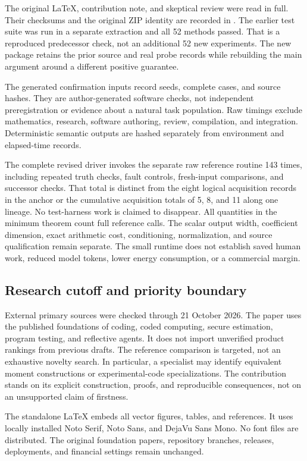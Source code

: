 \documentclass[11pt,letterpaper]{article}
\theoremstyle{remark}\newtheorem{remark}{Remark}[section]
\begin{document}
The original LaTeX, contribution note, and skeptical review were read in full. Their checksums and the original ZIP identity are recorded in . The earlier test suite was run in a separate extraction and all 52 methods passed. That is a reproduced predecessor check, not an additional 52 new experiments. The new package retains the prior source and real probe records while rebuilding the main argument around a different positive guarantee.

The generated confirmation inputs record seeds, complete cases, and source hashes. They are author-generated software checks, not independent preregistration or evidence about a natural task population. Raw timings exclude mathematics, research, software authoring, review, compilation, and integration. Deterministic semantic outputs are hashed separately from environment and elapsed-time records.

The complete revised driver invokes the separate raw reference routine 143 times, including repeated truth checks, fault controls, fresh-input comparisons, and successor checks. That total is distinct from the eight logical acquisition records in the anchor or the cumulative acquisition totals of 5, 8, and 11 along one lineage. No test-harness work is claimed to disappear. All quantities in the minimum theorem count full reference calls. The scalar output width, coefficient dimension, exact arithmetic cost, conditioning, normalization, and source qualification remain separate. The small runtime does not establish saved human work, reduced model tokens, lower energy consumption, or a commercial margin.

\subsection{Research cutoff and priority boundary}
External primary sources were checked through 21 October 2026. The paper uses the published foundations of coding, coded computing, secure estimation, program testing, and reflective agents. It does not import unverified product rankings from previous drafts. The reference comparison is targeted, not an exhaustive novelty search. In particular, a specialist may identify equivalent moment constructions or experimental-code specializations. The contribution stands on its explicit construction, proofs, and reproducible consequences, not on an unsupported claim of firstness.

The standalone LaTeX embeds all vector figures, tables, and references. It uses locally installed Noto Serif, Noto Sans, and DejaVu Sans Mono. No font files are distributed. The original foundation papers, repository branches, releases, deployments, and financial settings remain unchanged.
\end{document}
